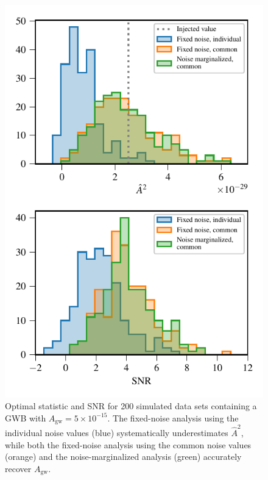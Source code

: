 \documentclass[twocolumn,aps,prd,superscriptaddress]{revtex4-1}
\newcommand{\Agw}{\ensuremath{A_\mathrm{gw}}}
\begin{document}
\begin{figure}[tb]
	\includegraphics[width=0.9\columnwidth]{plots/optstat_A5e-15.pdf}
	\caption{Optimal statistic and SNR for 200 simulated data sets 
			containing a GWB with $\Agw = 5\times10^{-15}$. 
			The fixed-noise analysis using the individual noise values (blue) 
			systematically underestimates $\hat{A}^2$, while both the 
			fixed-noise analysis using the common noise values (orange) 
			and the noise-marginalized analysis (green) 
			accurately recover $\Agw$.}
	\label{fig:os_datasetstats}
\end{figure}
\end{document}
